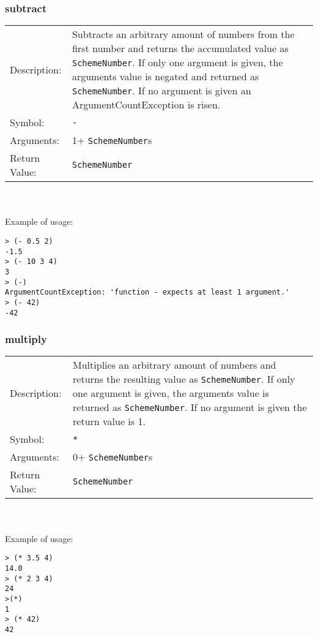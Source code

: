 \documentclass[12pt,a4paper]{scrartcl}
\begin{document}
\subsubsection*{subtract}
\begin{tabular}{l  p{13cm}}
Description: & Subtracts an arbitrary amount of numbers from the first number and returns the accumulated value as \lstinline{SchemeNumber}. If only one argument is given, the arguments value is negated and returned as \lstinline{SchemeNumber}. If no argument is given an ArgumentCountException is risen.\\
Symbol: & \lstinline{-}\\
Arguments: & 1+ \lstinline{SchemeNumber}s\\
Return Value: & \lstinline{SchemeNumber}
\end{tabular}
\\
\\
Example of usage:
\begin{lstlisting}
> (- 0.5 2)
-1.5
> (- 10 3 4)
3
> (-)
ArgumentCountException: 'function - expects at least 1 argument.'
> (- 42)
-42
\end{lstlisting}

\subsubsection*{multiply}
\begin{tabular}{l  p{13cm}}
Description: & Multiplies an arbitrary amount of numbers and returns the resulting value as \lstinline{SchemeNumber}. If only one argument is given, the arguments value is returned as \lstinline{SchemeNumber}. If no argument is given the return value is 1.\\
Symbol: & \lstinline{*}\\
Arguments: & 0+ \lstinline{SchemeNumber}s\\
Return Value: & \lstinline{SchemeNumber}
\end{tabular}
\\
\\
Example of usage:
\begin{lstlisting}
> (* 3.5 4)
14.0
> (* 2 3 4)
24
>(*)
1
> (* 42)
42
\end{lstlisting}
\end{document}
